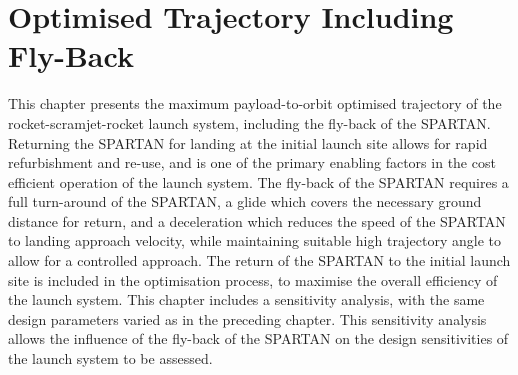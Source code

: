 
\cleardoublepage
\chapter{Optimised Trajectory Including Fly-Back}\label{chapter:Flyback}

This chapter presents the maximum payload-to-orbit optimised trajectory of the rocket-scramjet-rocket launch system, including the fly-back of the SPARTAN. 
 Returning the SPARTAN for landing at the initial launch site allows for rapid refurbishment and re-use, and is one of the primary enabling factors in the cost efficient operation of the launch system. 
The fly-back of the SPARTAN requires a full turn-around of the SPARTAN, a glide which covers the necessary ground distance for return, and a deceleration which reduces the speed of the SPARTAN to landing approach velocity, while maintaining suitable high trajectory angle to allow for a controlled approach. 
The return of the SPARTAN to the initial launch site is included in the optimisation process, to maximise the overall efficiency of the launch system. 
This chapter includes a sensitivity analysis, with the same design parameters varied as in the preceding chapter. This sensitivity analysis allows the influence of the fly-back of the SPARTAN on the design sensitivities of the launch system to be assessed.


